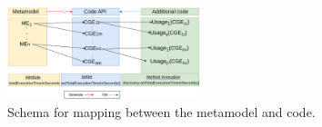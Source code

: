 \red{
	
	
	
}
\begin{figure}[t]\centering%
	\includegraphics[width=0.5\textwidth]{pics/chapter1pics/patternusages.png}
	\caption{Schema for mapping between the metamodel and code.}
	\label{fig:patternconcept}
	\vspace{-1em}
	
\end{figure}

